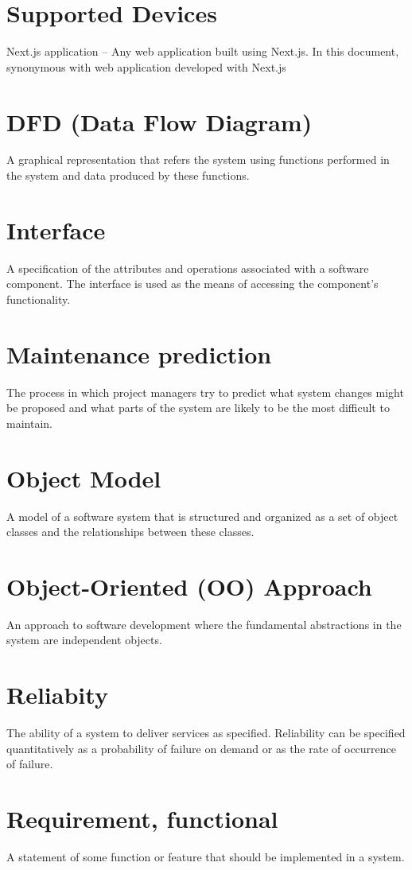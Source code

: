 \documentclass{scrreprt}
\begin{document}
\section{Supported Devices}
Next.js application – Any web application built using Next.js. In this document, synonymous with web application developed with Next.js
\section{DFD (Data Flow Diagram)}
A graphical representation that refers the system using functions
performed in the system and data produced by these functions.
\section{Interface}
A specification of the attributes and operations associated with a software component.
The interface is used as the means of accessing the component’s functionality.
\section{Maintenance prediction}
The process in which project managers try to predict what system changes
might be proposed and what parts of the system are likely to be the most difficult to maintain.
\section{Object Model}
A model of a software system that is structured and organized as a set of object
classes and the relationships between these classes.
\section{Object-Oriented (OO) Approach}
An approach to software development where the fundamental
abstractions in the system are independent objects.


\section{Reliabity}
The ability of a system to deliver services as specified. Reliability can be specified
quantitatively as a probability of failure on demand or as the rate of occurrence of failure.
\section{Requirement, functional}
A statement of some function or feature that should be implemented in a
system.
\end{document}
